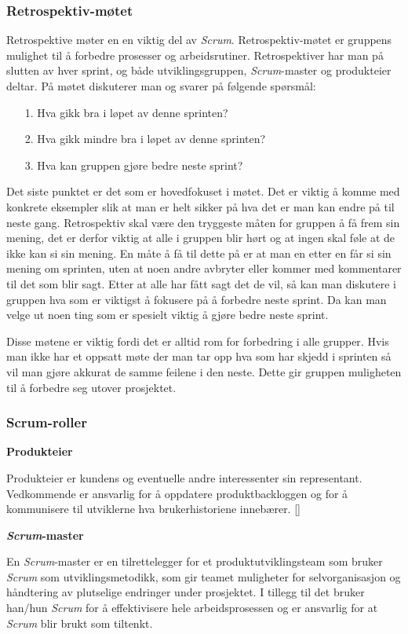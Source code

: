 \documentclass[12pt,a4paper,norsk]{article}
\begin{document}
	\subsubsection{Retrospektiv-møtet}
	Retrospektive møter en en viktig del av \textit{Scrum}. Retrospektiv-møtet er gruppens mulighet til å forbedre prosesser og arbeidsrutiner. Retrospektiver har man på slutten av hver sprint, og både utviklingsgruppen, \textit{Scrum}-master og produkteier deltar. På møtet diskuterer man og svarer på følgende spørsmål:
	\begin{itemize}
    \item[1.] Hva gikk bra i løpet av denne sprinten?
    \item[2.] Hva gikk mindre bra i løpet av denne sprinten?
    \item[3.] Hva kan gruppen gjøre bedre neste sprint?
    \end{itemize}
    Det siste punktet er det som er hovedfokuset i møtet. Det er viktig å komme med konkrete eksempler slik at man er helt sikker på hva det er man kan endre på til neste gang. Retrospektiv skal være den tryggeste måten for gruppen å få frem sin mening, det er derfor viktig at alle i gruppen blir hørt og at ingen skal føle at de ikke kan si sin mening. En måte å få til dette på er at man en etter en får si sin mening om sprinten, uten at noen andre avbryter eller kommer med kommentarer til det som blir sagt. Etter at alle har fått sagt det de vil, så kan man diskutere i gruppen hva som er viktigst å fokusere på å forbedre neste sprint. Da kan man velge ut noen ting som er spesielt viktig å gjøre bedre neste sprint. 

    Disse møtene er viktig fordi det er alltid rom for forbedring i alle grupper. Hvis man ikke har et oppsatt møte der man tar opp hva som har skjedd i sprinten så vil man gjøre akkurat de samme feilene i den neste. Dette gir gruppen muligheten til å forbedre seg utover prosjektet.
    \cite[side 82 - 88]{kniberg}
	\subsubsection{Scrum-roller}\label{scrumroller}
	\textbf {Produkteier}
    \par Produkteier er kundens og eventuelle andre interessenter sin representant. Vedkommende er ansvarlig for å oppdatere  produktbackloggen og for å kommunisere til utviklerne hva brukerhistoriene innebærer.
    [\cite{scrumguides}]
    
    \bigskip \noindent \textbf{\textit{Scrum}-master}
    \par En \textit{Scrum}-master er en tilrettelegger for et produktutviklingsteam som bruker \textit{Scrum} som utviklingsmetodikk, som gir teamet muligheter for selvorganisasjon og håndtering av plutselige endringer under prosjektet. I tillegg til det bruker han/hun \textit{Scrum} for å effektivisere hele arbeidsprosessen og er ansvarlig for at \textit{Scrum} blir brukt som tiltenkt.
 
\end{document}
